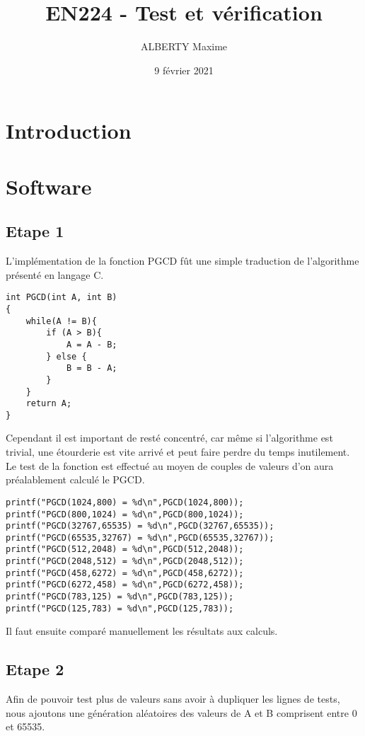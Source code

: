 \documentclass[a4paper]{article}
\title{EN224 - Test et vérification}
\author{ALBERTY Maxime}
\date{9 février 2021}
\begin{document}
\maketitle

\tableofcontents

\newpage %

\section{Introduction}

\section{Software}
    \subsection{Etape 1}
        L'implémentation de la fonction PGCD fût une simple traduction de l'algorithme présenté en langage C.
\begin{lstlisting}[style=CStyle]
int PGCD(int A, int B)
{
	while(A != B){
		if (A > B){
			A = A - B;
		} else {
			B = B - A;
		}
	}
	return A;
}
 \end{lstlisting}
        
        Cependant il est important de resté concentré, car même si l'algorithme est trivial, une étourderie est vite arrivé et peut faire perdre du temps inutilement.
        \\
        
        Le test de la fonction est effectué au moyen de couples de valeurs d'on aura préalablement calculé le PGCD. 
\begin{lstlisting}[style=CStyle]
printf("PGCD(1024,800) = %d\n",PGCD(1024,800));
printf("PGCD(800,1024) = %d\n",PGCD(800,1024));
printf("PGCD(32767,65535) = %d\n",PGCD(32767,65535));
printf("PGCD(65535,32767) = %d\n",PGCD(65535,32767));
printf("PGCD(512,2048) = %d\n",PGCD(512,2048));
printf("PGCD(2048,512) = %d\n",PGCD(2048,512));
printf("PGCD(458,6272) = %d\n",PGCD(458,6272));
printf("PGCD(6272,458) = %d\n",PGCD(6272,458));
printf("PGCD(783,125) = %d\n",PGCD(783,125));
printf("PGCD(125,783) = %d\n",PGCD(125,783));
\end{lstlisting}
        Il faut ensuite comparé manuellement les résultats aux calculs.
        
        
    \subsection{Etape 2}
        Afin de pouvoir test plus de valeurs sans avoir à dupliquer les lignes de tests, nous ajoutons une génération aléatoires des valeurs de A et B comprisent entre 0 et 65535.
        
\end{document}
